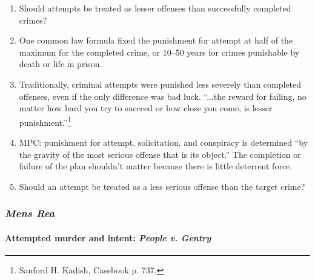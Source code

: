 \begin{enumerate}
    \item Should attempts be treated as lesser offenses than successfully 
    completed crimes?
    \item One common law formula fixed the punishment for attempt at half of 
    the maximum for the completed crime, or 10--50 years for crimes punishable 
    by death or life in prison.
    \item Traditionally, criminal attempts were punished less severely than 
    completed offenses, even if the only difference was bad luck. ``...the 
    reward for failing, no matter how hard you try to succeed or how close you 
    come, is lesser punishment.''\footnote{Sanford H. Kadish, Casebook p. 
    737.}
    \item MPC: punishment for attempt, solicitation, and conspiracy is 
    determined ``by the gravity of the most serious offense that is its 
    object.'' The completion or failure of the plan shouldn't matter because 
    there is little deterrent force.
    \item Should an attempt be treated as a less serious offense than the 
    target crime?
\end{enumerate}

\subsubsection{\emph{Mens Rea}}

\paragraph{Attempted murder and intent: \emph{People v. Gentry}}

